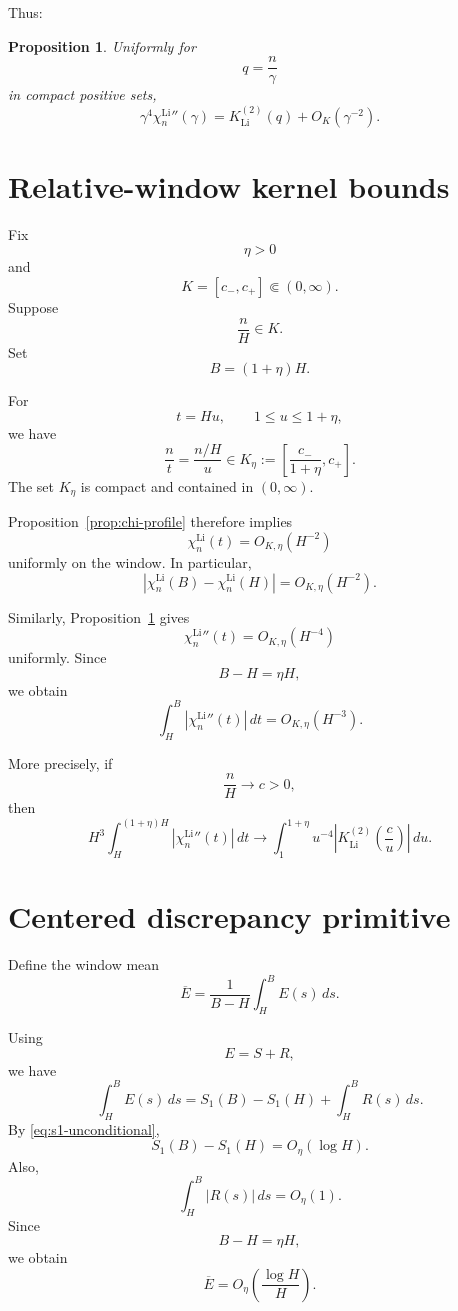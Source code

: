 \documentclass[11pt]{article}
\newtheorem{proposition}[theorem]{Proposition}
\newcommand{\LiSus}{\chi^{\mathrm{Li}}}
\newcommand{\Ebar}{\overline E}
\begin{document}
Thus:

\begin{proposition}
\label{prop:second-derivative}
Uniformly for
\[
q=\frac n\gamma
\]
in compact positive sets,
\[
\boxed{
\gamma^4\LiSus_n''(\gamma)
=
K_{\mathrm{Li}}^{(2)}(q)
+
O_K(\gamma^{-2}).
}
\]
\end{proposition}

\section{Relative-window kernel bounds}

Fix
\[
\eta>0
\]
and
\[
K=[c_-,c_+]
\Subset(0,\infty).
\]
Suppose
\[
\frac nH\in K.
\]
Set
\[
B=(1+\eta)H.
\]

For
\[
t=Hu,
\qquad
1\le u\le1+\eta,
\]
we have
\[
\frac nt
=
\frac{n/H}{u}
\in
K_\eta
:=
\left[
\frac{c_-}{1+\eta},
c_+
\right].
\]
The set \(K_\eta\) is compact and contained in \((0,\infty)\).

Proposition~\ref{prop:chi-profile} therefore implies
\[
\LiSus_n(t)
=
O_{K,\eta}(H^{-2})
\]
uniformly on the window. In particular,
\begin{equation}
\label{eq:endpoint-scale}
|\LiSus_n(B)-\LiSus_n(H)|
=
O_{K,\eta}(H^{-2}).
\end{equation}

Similarly, Proposition~\ref{prop:second-derivative} gives
\[
\LiSus_n''(t)
=
O_{K,\eta}(H^{-4})
\]
uniformly. Since
\[
B-H=\eta H,
\]
we obtain
\begin{equation}
\label{eq:second-variation-scale}
\int_H^B
|\LiSus_n''(t)|\,dt
=
O_{K,\eta}(H^{-3}).
\end{equation}

More precisely, if
\[
\frac nH\to c>0,
\]
then
\[
H^3
\int_H^{(1+\eta)H}
|\LiSus_n''(t)|\,dt
\to
\int_1^{1+\eta}
u^{-4}
\left|
K_{\mathrm{Li}}^{(2)}
\left(
\frac cu
\right)
\right|\,du.
\]

\section{Centered discrepancy primitive}

Define the window mean
\[
\Ebar
=
\frac1{B-H}
\int_H^B
E(s)\,ds.
\]

Using
\[
E=S+R,
\]
we have
\[
\int_H^B E(s)\,ds
=
S_1(B)-S_1(H)
+
\int_H^B R(s)\,ds.
\]
By \eqref{eq:s1-unconditional},
\[
S_1(B)-S_1(H)
=
O_\eta(\log H).
\]
Also,
\[
\int_H^B|R(s)|\,ds
=
O_\eta(1).
\]
Since
\[
B-H=\eta H,
\]
we obtain
\begin{equation}
\label{eq:Ebar}
\boxed{
\Ebar
=
O_\eta
\left(
\frac{\log H}{H}
\right).
}
\end{equation}
\end{document}
